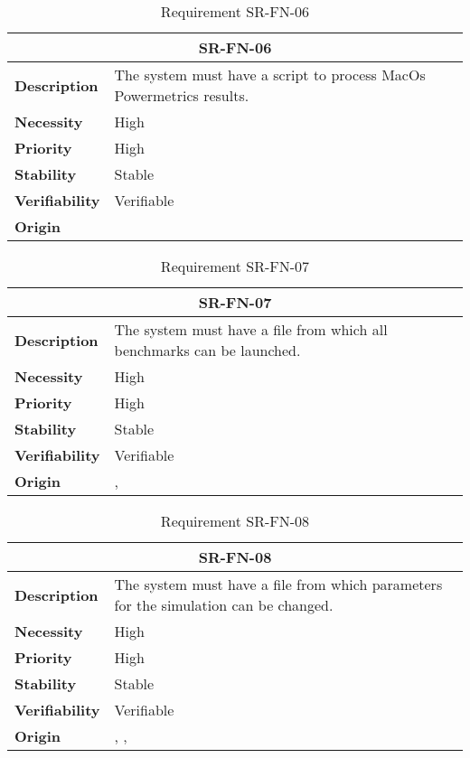 \begin{table}[H]
    \centering
    \begin{tabular}{l p{10cm}}
        \toprule
        \multicolumn{2}{c}{SR-FN-06} \\
        \toprule
        \textbf{Description}        &  The system must have a script to process MacOs Powermetrics results. \\
        \textbf{Necessity}          &  High \\
        \textbf{Priority}           &  High \\
        \textbf{Stability}          &  Stable \\
        \textbf{Verifiability}      & Verifiable \\
        \textbf{Origin}             & \textit{\nameref{tab:ur-ca-05}} \\
    \end{tabular}
    \caption{Requirement SR-FN-06}
    \label{tab:sr-fn-06}
\end{table}

\begin{table}[H]
    \centering
    \begin{tabular}{l p{10cm}}
        \toprule
        \multicolumn{2}{c}{SR-FN-07} \\
        \toprule
        \textbf{Description}        &  The system must have a file from which all benchmarks can be launched. \\
        \textbf{Necessity}          &  High \\
        \textbf{Priority}           &  High \\
        \textbf{Stability}          &  Stable \\
        \textbf{Verifiability}      & Verifiable \\
        \textbf{Origin}             & \textit{\nameref{tab:ur-ca-05}}, \textit{\nameref{tab:ur-ca-14}} \\
    \end{tabular}
    \caption{Requirement SR-FN-07}
    \label{tab:sr-fn-07}
\end{table}

\begin{table}[H]
    \centering
    \begin{tabular}{l p{10cm}}
        \toprule
        \multicolumn{2}{c}{SR-FN-08} \\
        \toprule
        \textbf{Description}        &  The system must have a file from which parameters for the simulation can be changed. \\
        \textbf{Necessity}          &  High \\
        \textbf{Priority}           &  High \\
        \textbf{Stability}          &  Stable \\
        \textbf{Verifiability}      & Verifiable \\
        \textbf{Origin}             & \textit{\nameref{tab:ur-ca-05}}, \textit{\nameref{tab:ur-ca-06}}, \textit{\nameref{tab:ur-ca-14}} \\
    \end{tabular}
    \caption{Requirement SR-FN-08}
    \label{tab:sr-fn-08}
\end{table}

